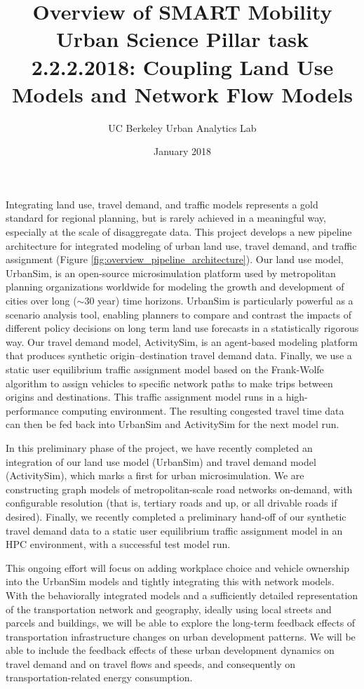 \documentclass[12pt]{article}
\title{Overview of SMART Mobility Urban Science Pillar task 2.2.2.2018: Coupling Land Use Models and Network Flow Models}
\author{UC Berkeley Urban Analytics Lab}
\date{January 2018}
\begin{document}
	
\maketitle

Integrating land use, travel demand, and traffic models represents a gold standard for regional planning, but is rarely achieved in a meaningful way, especially at the scale of disaggregate data. This project develops a new pipeline architecture for integrated modeling of urban land use, travel demand, and traffic assignment (Figure \ref{fig:overview_pipeline_architecture}). Our land use model, UrbanSim, is an open-source microsimulation platform used by metropolitan planning organizations worldwide for modeling the growth and development of cities over long ($\sim$30 year) time horizons. UrbanSim is particularly powerful as a scenario analysis tool, enabling planners to compare and contrast the impacts of different policy decisions on long term land use forecasts in a statistically rigorous way. Our travel demand model, ActivitySim, is an agent-based modeling platform that produces synthetic origin--destination travel demand data. Finally, we use a static user equilibrium traffic assignment model based on the Frank-Wolfe algorithm to assign vehicles to specific network paths to make trips between origins and destinations. This traffic assignment model runs in a high-performance computing environment. The resulting congested travel time data can then be fed back into UrbanSim and ActivitySim for the next model run.

In this preliminary phase of the project, we have recently completed an integration of our land use model (UrbanSim) and travel demand model (ActivitySim), which marks a first for urban microsimulation. We are constructing graph models of metropolitan-scale road networks on-demand, with configurable resolution (that is, tertiary roads and up, or all drivable roads if desired). Finally, we recently completed a preliminary hand-off of our synthetic travel demand data to a static user equilibrium traffic assignment model in an HPC environment, with a successful test model run.

This ongoing effort will focus on adding workplace choice and vehicle ownership into the UrbanSim models and tightly integrating this with network models. With the behaviorally integrated models and a sufficiently detailed representation of the transportation network and geography, ideally using local streets and parcels and buildings, we will be able to explore the long-term feedback effects of transportation infrastructure changes on urban development patterns. We will be able to include the feedback effects of these urban development dynamics on travel demand and on travel flows and speeds, and consequently on transportation-related energy consumption.
\end{document}
